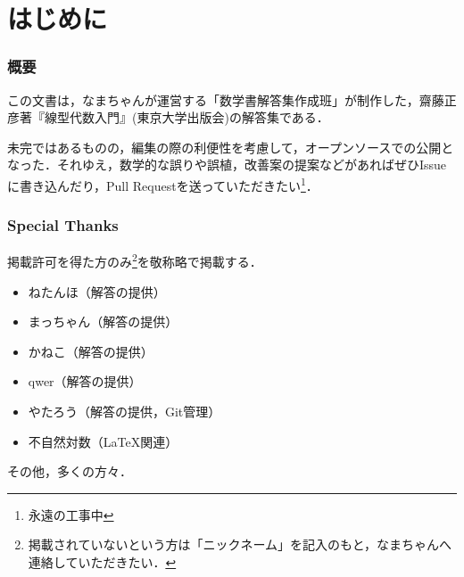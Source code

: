 \documentclass[a4paper,10pt,fleqn]{ltjsarticle}
\begin{document}


\thispagestyle{empty}

\newpage
{}
\pagecolor{white}

\begin{multicols}{3}
    \tableofcontents
\end{multicols}

\newpage

\part*{はじめに}

\section*{概要}

この文書は，なまちゃんが運営する「数学書解答集作成班」が制作した，齋藤正彦著『線型代数入門』(東京大学出版会)の解答集である．

未完ではあるものの，編集の際の利便性を考慮して，オープンソースでの公開となった．それゆえ，数学的な誤りや誤植，改善案の提案などがあればぜひIssueに書き込んだり，Pull Requestを送っていただきたい\footnote{永遠の工事中}．


\section*{Special Thanks}

掲載許可を得た方のみ\footnote{掲載されていないという方は「ニックネーム」を記入のもと，なまちゃんへ連絡していただきたい．}を敬称略で掲載する．
\begin{itemize}
    \item ねたんほ（解答の提供）
    \item まっちゃん（解答の提供）
    \item かねこ（解答の提供）
    \item qwer（解答の提供）
    \item やたろう（解答の提供，Git管理）
    \item 不自然対数（\LaTeX 関連）
\end{itemize}

その他，多くの方々．
\end{document}
